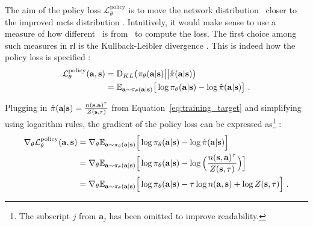 The aim of the policy loss $\mathcal L^{\text{policy}}_\theta$ is to move the network distribution \p\ closer to the improved \gls{mcts} distribution \phat. Intuitively, it would make sense to use a measure of how different \p\ is from \phat\ to compute the loss. The first choice among such measures in \gls{rl} is the Kullback-Leibler divergence \cite{kullbackInformationSufficiency1951}. This is indeed how the policy loss is specified \cite{moerlandA0CAlphaZero2018}:
\begin{align}\label{eq:policy_loss_dkl}
\mathcal L^{\text{policy}}_\theta(\mathbf a, \mathbf s) & = \text{D}_{KL} \big( \p \big|\big| \phat  \big) \\ 
& = \E{\mathbf a \sim \p} \big[ \log \p - \log \phat \big]~.
\end{align}

Plugging in $\phat = \frac{ n(\mathbf s, \mathbf a)^\tau }{ Z(\mathbf s, \tau) }$ from Equation~\ref{eq:training_target} and simplifying using logarithm rules, the gradient of the policy loss can be expressed as\footnote{The subscript $j$ from $\mathbf a_j$ has been omitted to improve readability.} \cite{moerlandA0CAlphaZero2018}:
\begin{align}\label{eq:policy_loss_gradient_w_target}
\nabla_\theta \mathcal L^{\text{policy}}_\theta(\mathbf a, \mathbf s) & = \nabla_\theta \E{\mathbf a \sim \p} \Big[ \log \p - \log \phat \Big] \nonumber  \\
& = \nabla_\theta \E{\mathbf a \sim \p} \Big[ \log \p - \log \Big( \frac{ n(\mathbf s , \mathbf a)^\tau }{ Z(\mathbf s, \tau) } \Big) \Big] \nonumber \\
& = \nabla_\theta \E{\mathbf a \sim \p} \Big[ \log \p - \tau \log n(\mathbf a, \mathbf s) + \log Z(\mathbf s, \tau)  \Big]~.
\end{align}

